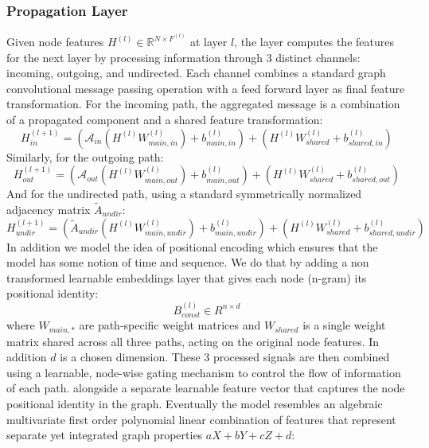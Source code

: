 \documentclass[utf8]{article}
\begin{document}
	\subsubsection{Propagation Layer}
	Given node features $H^{(l)} \in \mathbb{R}^{N \times F^{(l)}}$ at layer $l$, the layer computes the features for the next layer by processing information through 3 distinct channels: incoming, outgoing, and undirected. Each channel combines a standard graph convolutional message passing operation with a feed forward layer as final feature transformation.
	For the incoming path, the aggregated message is a combination of a propagated component and a shared feature transformation:
	\begin{equation}
		H_{in}^{(l+1)} = \left( \mathcal{A}_{in} (H^{(l)} W_{main,in}^{(l)}) + b_{main,in}^{(l)} \right) + \left( H^{(l)} W_{shared}^{(l)} + b_{shared,in}^{(l)} \right)
	\end{equation}
	Similarly, for the outgoing path:
	\begin{equation}
		H_{out}^{(l+1)} = \left( \mathcal{A}_{out} (H^{(l)} W_{main,out}^{(l)}) + b_{main,out}^{(l)} \right) + \left( H^{(l)} W_{shared}^{(l)} + b_{shared,out}^{(l)} \right)
	\end{equation}
	And for the undirected path, using a standard symmetrically normalized adjacency matrix $\tilde{A}_{undir}$:
	\begin{equation}
		H_{undir}^{(l+1)} = \left( \tilde{A}_{undir} (H^{(l)} W_{main,undir}^{(l)}) + b_{main,undir}^{(l)} \right) + \left( H^{(l)} W_{shared}^{(l)} + b_{shared,undir}^{(l)} \right)
	\end{equation}
	In addition we model the idea of positional encoding which ensures that the model has some notion of time and sequence. We do that by adding a non transformed learnable embeddings layer that gives each node (n-gram) its positional identity:
	\begin{equation}
		B_{const}^{(l)} \in R^{n \times d}
	\end{equation}
	where $W_{main,*}$ are path-specific weight matrices and $W_{shared}$ is a single weight matrix shared across all three paths, acting on the original node features. In addition $d$ is a chosen dimension. These 3 processed signals are then combined using a learnable, node-wise gating mechanism to control the flow of information of each path. alongside a separate learnable feature vector that captures the node positional identity in the graph. Eventually the model resembles an algebraic multivariate first order polynomial linear combination of features that represent separate yet integrated graph properties $aX + bY + cZ + d$:
\end{document}
